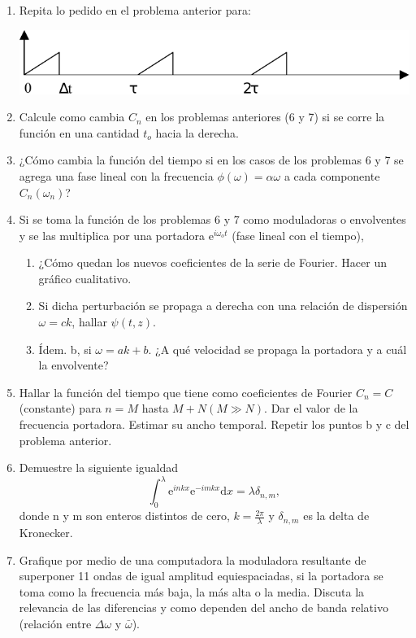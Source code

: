\documentclass[11pt,spanish,a4paper]{article}
\begin{document}
\begin{enumerate}
\item Repita lo pedido en el problema anterior para:
	\begin{center}
			\includegraphics[width=0.75\linewidth]{g06e07}
	\end{center}


\item Calcule como cambia \(C_n\) en los problemas anteriores (6 y 7) si se corre la función en
	una cantidad \(t_o\) hacia la derecha.


\item ¿Cómo cambia la función del tiempo si en los casos de los problemas 6 y 7 se agrega una fase lineal con la frecuencia \(\phi(\omega)= \alpha \omega \) a cada componente \(C_n(\omega_n) \)?

	
\item Si se toma la función de los problemas 6 y 7 como moduladoras o envolventes y se las multiplica por una portadora \(\mathrm{e}^{i \omega_o t} \) (fase lineal con el tiempo),
	\begin{enumerate}
		\item ¿Cómo quedan los nuevos coeficientes de la serie de Fourier.
			Hacer un gráfico cualitativo.
		\item Si dicha perturbación se propaga a derecha con una relación de dispersión 
			\(\omega= c k\), hallar \(\psi(t,z)\).
		\item Ídem. b, si \(\omega= a k+ b\).
			¿A qué velocidad se propaga la portadora y a cuál la envolvente?
	\end{enumerate}

\item Hallar la función del tiempo que tiene como coeficientes de Fourier \(C_n= C\) (constante) para \(n=M\) hasta \(M+N (M \gg N)\).
	Dar el valor de la frecuencia portadora.
	Estimar su ancho temporal.
	Repetir los puntos b y c del problema anterior.


\item Demuestre la siguiente igualdad
	\[
		\int_0^\lambda \mathrm{e}^{i n k x} \mathrm{e}^{- i m k x} \mathrm{d}x = \lambda \delta_{n,m} , 
	\]
	donde n y m son enteros distintos de cero, \(k= \frac{2\pi}{\lambda}\) y \(\delta_{n,m}\) es la delta de Kronecker.


\item Grafique por medio de una computadora la moduladora resultante de superponer 11 ondas de igual amplitud equiespaciadas, si la portadora se toma como la frecuencia más baja, la más alta o la media.
	Discuta la relevancia de las diferencias y como dependen del ancho de banda relativo (relación entre \(\Delta \omega\) y \(\bar{\omega}\)).


\end{enumerate}
\end{document}
